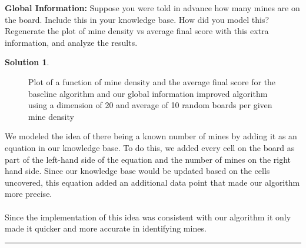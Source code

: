 \documentclass{article}
\theoremstyle{definition}
\def\fline{\rule{0.75\linewidth}{0.5pt}}
\newcommand{\finishline}{\vspace{-15pt}\begin{center}\fline\end{center}}
\newtheorem*{solution*}{Solution}
\newenvironment{solution}{\begin{solution*}}{{\finishline} \end{solution*}}
\begin{document}
\smallskip

\textbf{Global Information: }
	Suppose you were told in advance how many mines are on the board. Include this in your knowledge base. How did you model this? Regenerate the plot of mine density vs average final score with this extra information, and analyze the results.
\begin{solution} \hfill \\
	\begin{figure}[H]
	\centering
	\caption{Plot of a function of mine density and the average final score for the baseline algorithm and our global information improved algorithm using a dimension of 20 and average of 10 random boards per given mine density}
	\end{figure}
	We modeled the idea of there being a known number of mines by adding it as an equation in our knowledge base. To do this, we added every cell on the board as part of the left-hand side of the equation and the number of mines on the right hand side. Since our knowledge base would be updated based on the cells uncovered, this equation added an additional data point that made our algorithm more precise. 
	\\\\
	Since the implementation of this idea was consistent with our algorithm it only made it quicker and more accurate in identifying mines. 
\end{solution}
\smallskip
\end{document}
